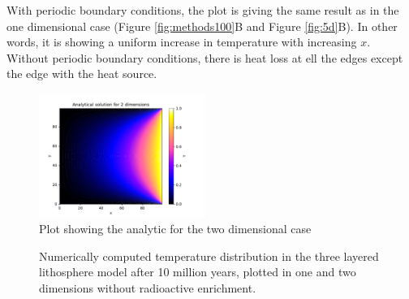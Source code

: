 \documentclass[10pt,a4paper]{article}
\begin{document}
\noindent With periodic boundary conditions, the plot is giving the same result as in the one dimensional case (Figure \ref{fig:methods100}B and Figure \ref{fig:5d}B). In other words, it is showing a uniform increase in temperature with increasing $x$. Without periodic boundary conditions, there is heat loss at ell the edges except the edge with the heat source. 

\begin{figure} [H]
	\centering
	\includegraphics[width=0.48\textwidth]{../plots/2danal.pdf}
	\caption{\label{fig:2danal} Plot showing the analytic for the two dimensional case}
\end{figure}




\begin{figure} [H]
	\centering
	\caption{\label{10notenriched}Numerically computed temperature distribution in the three layered lithosphere model after 10 million years, plotted in one and two dimensions without radioactive enrichment. }
\end{figure}
\end{document}
